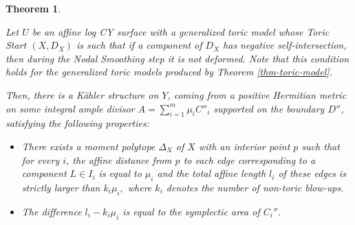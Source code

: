 \documentclass[11pt, reqno]{amsart}
\newtheorem{theorem}{Theorem}[section]
\theoremstyle{definition}
\begin{document}
\begin{theorem}\label{thm-tri-pack}

Let $U$ be an affine log CY surface with a generalized toric model whose Toric Start $(X, D_X)$ is such that if a component of $D_X$ has negative self-intersection, then during the Nodal Smoothing step it is not deformed. Note that this condition holds for the generalized toric models produced by Theorem \ref{thm-toric-model}. 


Then, there is a Kähler structure on $Y$, coming from a positive Hermitian metric on some integral ample divisor  $A = \sum_{i=1}^m \mu_i C''_i$ supported on the boundary $D''$, satisfying the following properties:

\begin{itemize}
    \item There exists a moment polytope $\Delta_X$ of $X$ with an interior point $p$ such that for every $i$, the affine distance from $p$ to each edge corresponding to a component $L\in I_i$ is equal to $\mu_i$ and the total affine length $l_i$ of these edges is strictly larger than $k_i\mu_i,$ where $k_i$ denotes the number of non-toric blow-ups.
    \item The difference $l_i-k_i\mu_i$ is equal to the symplectic area of $C_i''$. 
\end{itemize}





\end{theorem}
\end{document}
